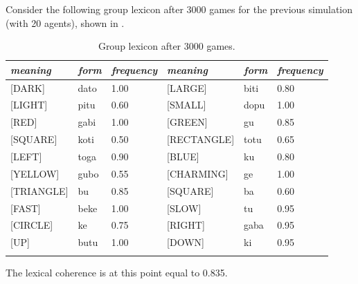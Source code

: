 Consider the following group lexicon after 3000 games for the
previous simulation (with 20 agents), shown in . 
\begin{table}
\begin{center}
\begin{tabular}{l  l  l  l  l  l }
\lsptoprule 
{\itshape meaning} & {\itshape form} & {\itshape frequency} & {\itshape meaning} & {\itshape form} & {\itshape frequency} \\ \midrule
{}[DARK]& dato & 1.00 & [LARGE]& biti & 0.80 \\  
{}[LIGHT]& pitu & 0.60 & [SMALL]& dopu & 1.00 \\  
{}[RED]& gabi & 1.00 & [GREEN]& gu & 0.85 \\  
{}[SQUARE]& koti & 0.50 & [RECTANGLE]& totu & 0.65 \\  
{}[LEFT]& toga & 0.90 & [BLUE]& ku & 0.80 \\  
{}[YELLOW]& gubo & 0.55 & [CHARMING]& ge & 1.00 \\  
{}[TRIANGLE]& bu & 0.85 & [SQUARE]& ba & 0.60 \\  
{}[FAST]& beke & 1.00 & [SLOW]& tu & 0.95 \\  
{}[CIRCLE]& ke & 0.75 & [RIGHT]& gaba & 0.95 \\  
{}[UP]& butu & 1.00 & [DOWN]& ki & 0.95 \\  
\lspbottomrule
\end{tabular}
\caption{\label{tab:t-mem3000} Group lexicon after 3000 games.}
\end{center}
\end{table}
The lexical coherence is at this point equal to 0.835. 

